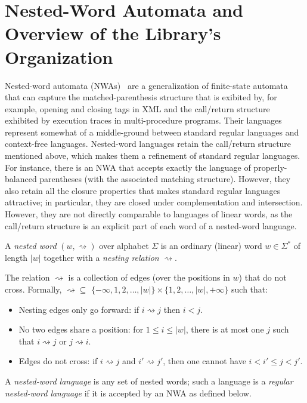 \section{Nested-Word Automata and Overview of the Library's Organization}
\label{App:nwa-definition}

Nested-word automata (NWAs)~\cite{DLT:AM2006,JACM:AM2009} are a generalization
of finite-state automata that can capture the matched-parenthesis structure
that is exibited by, for example, opening and closing tags in XML and the
call/return structure exhibited by execution traces in multi-procedure
programs. Their languages represent somewhat of a middle-ground between
standard regular languages and context-free languages. Nested-word languages
retain the call/return structure mentioned above, which makes them a
refinement of standard regular languages. For instance, there is an NWA that
accepts exactly the language of properly-balanced parentheses (with the
associated matching structure). However, they also retain all the closure
properties that makes standard regular languages attractive; in particular,
they are closed under complementation and intersection. However, they are not
directly comparable to languages of linear words, as the call/return
structure is an explicit part of each word of a nested-word language.

\begin{definition}
  A \textsl{nested word} $(w,\rightsquigarrow)$ over alphabet $\Sigma$ is an
  ordinary (linear) word $w \in \Sigma^*$ of length $|w|$ together with a
  \textsl{nesting relation} $\rightsquigarrow$.

  The relation $\rightsquigarrow$ is a collection of edges (over the
  positions in $w$) that do not cross. Formally, $\rightsquigarrow \subseteq$
  $\{-\infty, 1, 2, \ldots, |w| \} \times \{1, 2, \ldots, |w|, +\infty\}$
  such that:
  \begin{itemize}
    \item
      Nesting edges only go forward: if $i \rightsquigarrow j$ then $i < j$.
    \item
      No two edges share a position: for $1 \leq i \leq |w|$, there is at
      most one $j$ such that $i \rightsquigarrow j$ or $j \rightsquigarrow
      i$.
    \item
      Edges do not cross: if $i \rightsquigarrow j$ and $i' \rightsquigarrow
      j'$, then one cannot have $i < i' \leq j < j'$.
  \end{itemize}

  A \textsl{nested-word language} is any set of nested words; such a language
  is a \textsl{regular nested-word language} if it is accepted by an NWA as
  defined below.
\end{definition}

